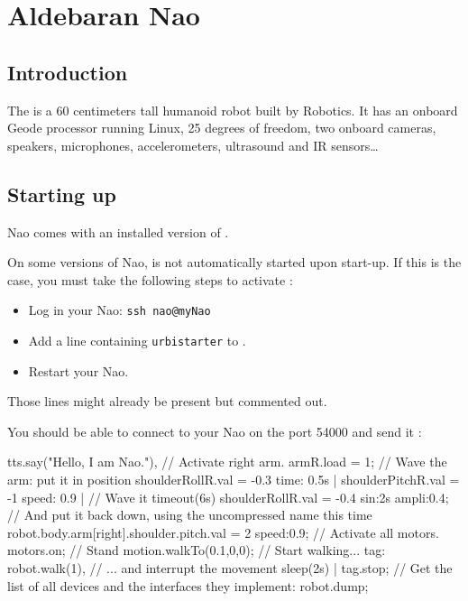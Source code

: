 
\newcommand{\naoqi}{NaoQi\xspace}

\chapter{Aldebaran Nao}
\label{sec:nao}

\section{Introduction}

The  is a 60 centimeters tall humanoid robot built by
 Robotics.  It has an onboard Geode processor running Linux,
25 degrees of freedom, two onboard cameras, speakers, microphones,
accelerometers, ultrasound and IR sensors\ldots

\section{Starting up}

Nao comes with an installed version of \urbi.

On some versions of Nao, \urbi is not automatically started upon start-up.
If this is the case, you must take the following steps to activate \urbi:

\begin{itemize}
\item Log in your Nao: \lstinline|ssh nao@myNao|
\item Add a line containing \lstinline|urbistarter| to
  .
\item Restart your Nao.
\end{itemize}

Those lines might already be present but commented out.

You should be able to connect to your Nao on the port 54000 and send it \us:

\begin{urbiunchecked}
tts.say("Hello, I am Nao."),
// Activate right arm.
armR.load = 1;
// Wave the arm: put it in position
shoulderRollR.val = -0.3 time: 0.5s |
shoulderPitchR.val = -1 speed: 0.9 |
// Wave it
timeout(6s) shoulderRollR.val = -0.4 sin:2s ampli:0.4;
// And put it back down, using the uncompressed name this time
robot.body.arm[right].shoulder.pitch.val = 2 speed:0.9;
// Activate all motors.
motors.on;
// Stand
motion.walkTo(0.1,0,0);
// Start walking...
tag: robot.walk(1),
// ... and interrupt the movement
sleep(2s) | tag.stop;
// Get the list of all devices and the interfaces they implement:
robot.dump;
\end{urbiunchecked}


